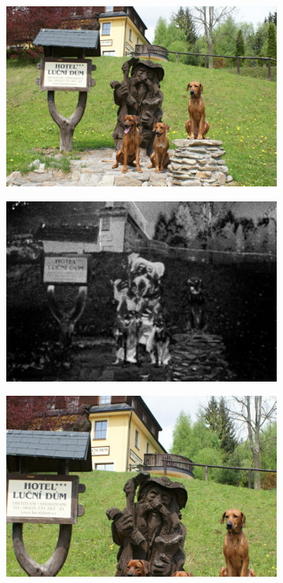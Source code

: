 \begin{figure}[H]
    \centering
    \begin{subfigure}{0.32\textwidth}
      \centering
      \includegraphics[scale=1.0]{obrazky/ORIGivos05.jpg}
      \caption{}
    \end{subfigure}
    \begin{subfigure}{0.32\textwidth}
      \centering
      \includegraphics[scale=1.0]{obrazky/badStentifordSM.jpg}
      \caption{}
      \label{obr:autocropFailsB}
    \end{subfigure}
    \begin{subfigure}{0.32\textwidth}
      \centering
      \includegraphics[scale=1.0]{obrazky/badcropStentiford.jpg}

\end{subfigure}
\end{figure}
